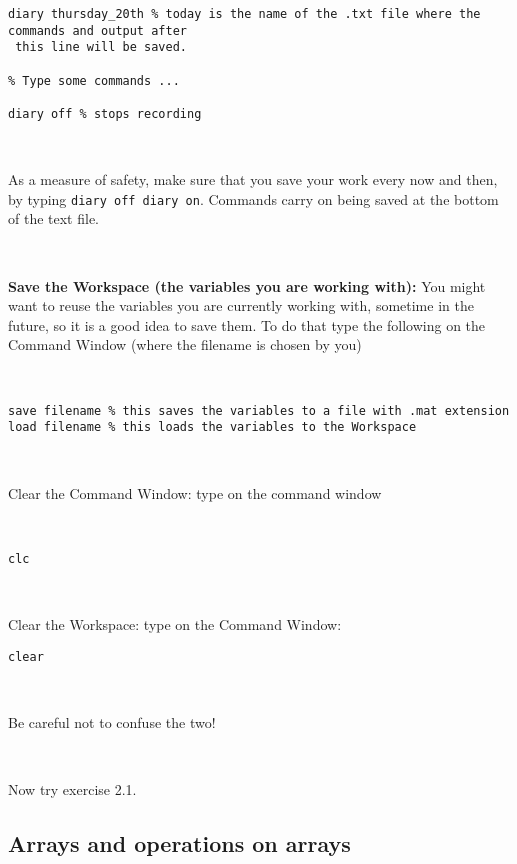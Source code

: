 \documentclass[11pt]{amsart}
\begin{document}
\color{blue}
\begin{verbatim}
diary thursday_20th % today is the name of the .txt file where the commands and output after
 this line will be saved.

% Type some commands ...

diary off % stops recording 
\end{verbatim}
\color{black}

\

As a measure of safety, make sure that you save your work every now and then, by typing \verb+diary off diary on+. Commands carry on being saved at the bottom of the text file.

\


{\bf Save the Workspace (the variables you are working with):} You might want to reuse the variables you are currently working with, sometime in the future, so it is a good idea to save them. To do that type the following on the Command Window (where the filename is chosen by you)

\

\color{blue}
\begin{verbatim}
save filename % this saves the variables to a file with .mat extension
load filename % this loads the variables to the Workspace
\end{verbatim}
\color{black}

\

Clear the Command Window: type on the command window 

\

\color{blue}
\begin{verbatim}
clc
\end{verbatim}
\color{black}

\

Clear the Workspace: type on the Command Window:
\

\color{blue}
\begin{verbatim}
clear
\end{verbatim}
\color{black}

\

Be careful not to confuse the two!

\

Now try exercise 2.1.

\subsection{Arrays and operations on arrays}

\
\end{document}

